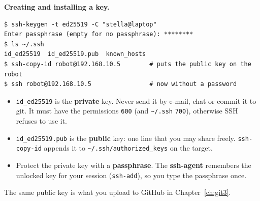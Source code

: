 \begin{center}
\label{fig:l3_keys}
\end{center}

\textbf{Creating and installing a key.}
\begin{verbatim}
$ ssh-keygen -t ed25519 -C "stella@laptop"
Enter passphrase (empty for no passphrase): ********
$ ls ~/.ssh
id_ed25519  id_ed25519.pub  known_hosts
$ ssh-copy-id robot@192.168.10.5        # puts the public key on the robot
$ ssh robot@192.168.10.5                # now without a password
\end{verbatim}
\begin{itemize}[nosep]
  \item \texttt{id\_ed25519} is the \textbf{private} key. Never send it by e-mail, chat or commit it to git. It must have the permissions \texttt{600} (and \texttt{\textasciitilde/.ssh} \texttt{700}), otherwise SSH refuses to use it.
  \item \texttt{id\_ed25519.pub} is the \textbf{public} key: one line that you may share freely. \texttt{ssh-copy-id} appends it to \texttt{\textasciitilde/.ssh/authorized\_keys} on the target.
  \item Protect the private key with a \textbf{passphrase}. The \textbf{ssh-agent} remembers the unlocked key for your session (\verb|ssh-add|), so you type the passphrase once.
\end{itemize}
The same public key is what you upload to GitHub in Chapter~\ref{ch:git3}.

